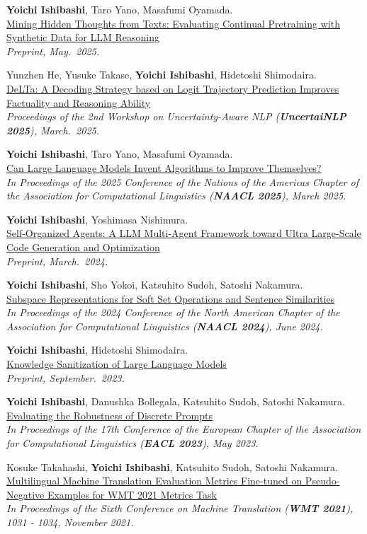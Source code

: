 \documentclass[11pt,a4paper]{article}
\let\oldhref\href
\renewcommand{\href}[2]{\oldhref{#1}{\uline{#2}}}
\newcommand{\paper}[3]{\par\vspace{12pt}\noindent #1\\ #2\\ {\itshape #3}\par}
\begin{document}
\paper{\textbf{Yoichi Ishibashi}, Taro Yano, Masafumi Oyamada.}
{\href{https://arxiv.org/abs/2505.10182}{Mining Hidden Thoughts from Texts: Evaluating Continual Pretraining with Synthetic Data for LLM Reasoning}}
{Preprint, May.\ 2025.}

\paper{Yunzhen He, Yusuke Takase, \textbf{Yoichi Ishibashi}, Hidetoshi Shimodaira.}
{\href{https://arxiv.org/abs/2503.02343}{DeLTa: A Decoding Strategy based on Logit Trajectory Prediction Improves Factuality and Reasoning Ability}}
{Proceedings of the 2nd Workshop on Uncertainty-Aware NLP (\textbf{UncertaiNLP 2025}), March.\ 2025.}

\paper{\textbf{Yoichi Ishibashi}, Taro Yano, Masafumi Oyamada.}
{\href{https://arxiv.org/abs/2410.15639}{Can Large Language Models Invent Algorithms to Improve Themselves?}}
{In Proceedings of the 2025 Conference of the Nations of the Americas Chapter of the Association for Computational Linguistics (\textbf{NAACL 2025}), March 2025.}

\paper{\textbf{Yoichi Ishibashi}, Yoshimasa Nishimura.}
{\href{https://arxiv.org/abs/2404.02183}{Self-Organized Agents: A LLM Multi-Agent Framework toward Ultra Large-Scale Code Generation and Optimization}}
{Preprint, March.\ 2024.}

\paper{\textbf{Yoichi Ishibashi}, Sho Yokoi, Katsuhito Sudoh, Satoshi Nakamura.}
{\href{https://arxiv.org/abs/2210.13034}{Subspace Representations for Soft Set Operations and Sentence Similarities}}
{In Proceedings of the 2024 Conference of the North American Chapter of the Association for Computational Linguistics (\textbf{NAACL 2024}), June 2024.}

\paper{\textbf{Yoichi Ishibashi}, Hidetoshi Shimodaira.}
{\href{https://arxiv.org/abs/2309.11852}{Knowledge Sanitization of Large Language Models}}
{Preprint, September.\ 2023.}

\paper{\textbf{Yoichi Ishibashi}, Danushka Bollegala, Katsuhito Sudoh, Satoshi Nakamura.}
{\href{https://arxiv.org/abs/2302.05619}{Evaluating the Robustness of Discrete Prompts}}
{In Proceedings of the 17th Conference of the European Chapter of the Association for Computational Linguistics (\textbf{EACL 2023}), May 2023.}

\paper{Kosuke Takahashi, \textbf{Yoichi Ishibashi}, Katsuhito Sudoh, Satoshi Nakamura.}
{\href{http://www.statmt.org/wmt21/pdf/2021.wmt-1.113.pdf}{Multilingual Machine Translation Evaluation Metrics Fine-tuned on Pseudo-Negative Examples for WMT 2021 Metrics Task}}
{In Proceedings of the Sixth Conference on Machine Translation (\textbf{WMT 2021}), 1031 - 1034, November 2021.}
\end{document}
